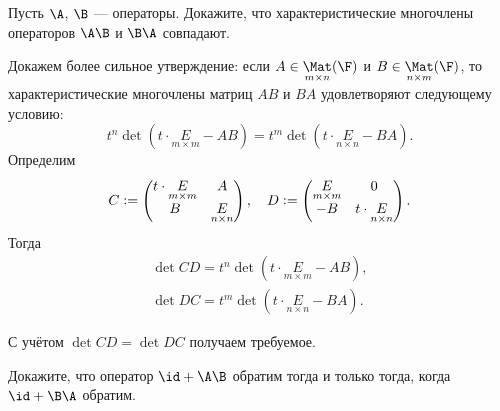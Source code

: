 \begin{problem}
    Пусть $\A$, $\B$ --- операторы. Докажите, что характеристические многочлены операторов $\A\B$ и $\B\A$ совпадают.
\end{problem}

\begin{solution}
    Докажем более сильное утверждение: если $A \in \underset{m \times n}{\Mat}(\F)$ и $B \in \underset{n \times m}{\Mat}(\F)$, то характеристические многочлены матриц $AB$ и $BA$ удовлетворяют следующему условию:
    \[
        t^n\det(t \cdot \underset{m \times m}{E} - AB) = t^m\det(t \cdot \underset{n \times n}{E} - BA).
    \]
    Определим 
    \[
        C \vcentcolon =
        \begin{pmatrix}
            t \cdot \underset{m \times m}{E} & A\\
            B & \underset{n \times n}{E}
        \end{pmatrix},\quad
        D \vcentcolon = 
        \begin{pmatrix}
            \underset{m \times m}{E} & 0\\
            -B & t \cdot \underset{n \times n}{E}
        \end{pmatrix}.
    \]
    Тогда
    \begin{gather*}
        \det CD = t^n\det(t \cdot \underset{m \times m}{E} - AB),\\
        \det DC = t^m\det(t \cdot \underset{n \times n}{E} - BA).
    \end{gather*}

    С учётом $\det CD = \det DC$ получаем требуемое.
\end{solution}

\begin{problem}
    Докажите, что оператор $\id + \A\B$ обратим тогда и только тогда, когда $\id + \B\A$ обратим.
\end{problem}

\begin{solution}
\end{solution}

